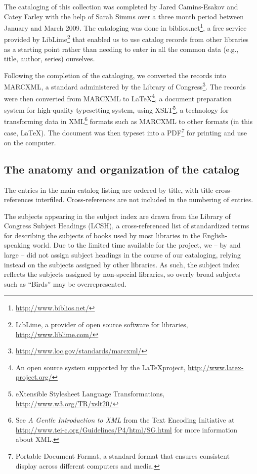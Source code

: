 The cataloging of this collection was completed by Jared Camins-Esakov and Catey
Farley with the help of Sarah Simms over a three month period between January
and March 2009. The cataloging was done in
{\ddag}biblios.net\footnote{\url{http://www.biblios.net/}}, a free service provided
by LibLime\footnote{LibLime, a provider of open source software for libraries,
\url{http://www.liblime.com/}} that enabled us to use catalog records from other
libraries as a starting point rather than needing to enter in all the common
data (e.g., title, author, series) ourselves.

Following the completion of the cataloging, we converted the records into MARCXML,
a standard administered by the Library of
Congress\footnote{\url{http://www.loc.gov/standards/marcxml/}}. The records were
then converted from MARCXML to \LaTeX\footnote{An open source system supported by
the \LaTeX project, \url{http://www.latex-project.org/}}, a document preparation
system for high-quality typesetting system, using XSLT\footnote{eXtensible
Stylesheet Language Transformations, \url{http://www.w3.org/TR/xslt20/}}, a
technology for transforming data in XML\footnote{See \emph{A Gentle Introduction
to XML} from the Text Encoding Initiative at
\url{http://www.tei-c.org/Guidelines/P4/html/SG.html} for more information about
XML.} formats such as MARCXML to other formats (in this case, \LaTeX). The document
was then typeset into a PDF\footnote{Portable Document Format, a standard format
that ensures consistent display across different computers and media.} for printing
and use on the computer.

\subsection*{The anatomy and organization of the catalog}

The entries in the main catalog listing are ordered by title, with title
cross-references interfiled. Cross-references are not included in the numbering
of entries.

The subjects appearing in the subject index are drawn from the Library of
Congress Subject Headings (LCSH), a cross-referenced list of standardized terms
for describing the subjects of books used by most libraries in the
English-speaking world. Due to the limited time available for the project,
we -- by and large -- did not assign subject headings in the course of our
cataloging, relying instead on the subjects assigned by other libraries. As
such, the subject index reflects the subjects assigned by non-special libraries,
so overly broad subjects such as ``Birds'' may be overrepresented.

